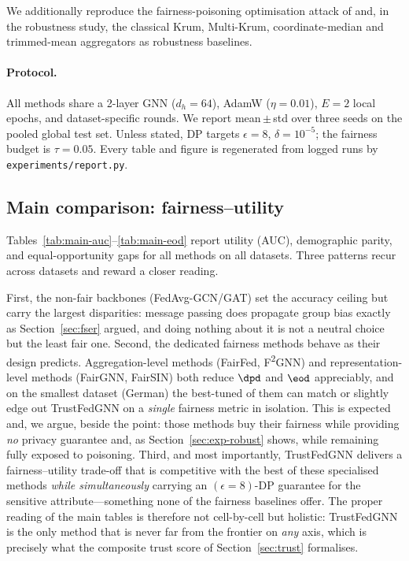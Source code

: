 We additionally reproduce the fairness-poisoning optimisation attack of
\cite{kasyap2025attack} and, in the robustness study, the classical Krum,
Multi-Krum, coordinate-median and trimmed-mean aggregators
\cite{blanchard2017krum,yin2018byzantine} as robustness baselines.

\paragraph{Protocol.}
All methods share a 2-layer GNN ($d_h{=}64$), AdamW ($\eta{=}0.01$), $E{=}2$
local epochs, and dataset-specific rounds. We report mean\,$\pm$\,std over three
seeds on the pooled global test set. Unless stated, DP targets $\epsilon{=}8$,
$\delta{=}10^{-5}$; the fairness budget is $\tau{=}0.05$. Every table and figure
is regenerated from logged runs by \texttt{experiments/report.py}.

\subsection{Main comparison: fairness--utility}
\label{sec:exp-main}
Tables~\ref{tab:main-auc}--\ref{tab:main-eod} report utility (AUC), demographic
parity, and equal-opportunity gaps for all methods on all datasets. Three
patterns recur across datasets and reward a closer reading.

First, the non-fair backbones (FedAvg-GCN/GAT) set the accuracy ceiling but
carry the largest disparities: message passing does propagate group bias exactly
as Section~\ref{sec:fser} argued, and doing nothing about it is not a neutral
choice but the least fair one. Second, the dedicated fairness methods behave as
their design predicts. Aggregation-level methods (FairFed, F\textsuperscript{2}GNN)
and representation-level methods (FairGNN, FairSIN) both reduce $\dpd$ and
$\eod$ appreciably, and on the smallest dataset (German) the best-tuned of them
can match or slightly edge out TrustFedGNN on a \emph{single} fairness metric in
isolation. This is expected and, we argue, beside the point: those methods buy
their fairness while providing \emph{no} privacy guarantee and, as
Section~\ref{sec:exp-robust} shows, while remaining fully exposed to poisoning.
Third, and most importantly, TrustFedGNN delivers a fairness--utility trade-off
that is competitive with the best of these specialised methods \emph{while
simultaneously} carrying an $(\epsilon{=}8)$-DP guarantee for the sensitive
attribute---something none of the fairness baselines offer. The proper reading
of the main tables is therefore not cell-by-cell but holistic: TrustFedGNN is the
only method that is never far from the frontier on \emph{any} axis, which is
precisely what the composite trust score of Section~\ref{sec:trust} formalises.


